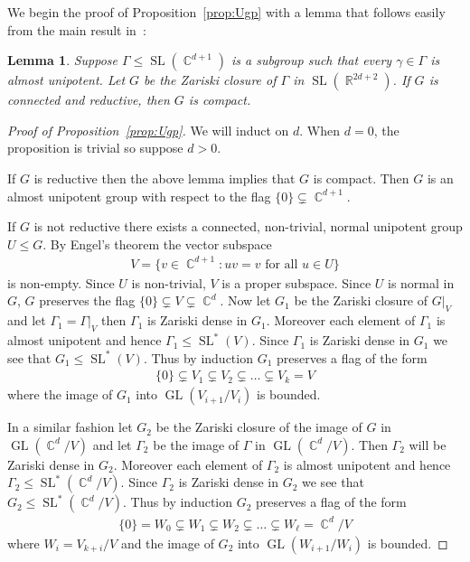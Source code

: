 \documentclass[12pt]{amsart}
\theoremstyle{plain}
\newtheorem{lemma}[proposition]{Lemma}
\theoremstyle{definition}
\theoremstyle{remark}
\begin{document}
We begin the proof of Proposition~\ref{prop:Ugp} with a lemma that follows easily from the main result in~\cite{P1993}:

\begin{lemma}\cite{P1993}
Suppose $\Gamma \leq \operatorname{SL}(\operatorname{\mathbb{C}}^{d+1})$ is a subgroup such that every $\gamma \in \Gamma$ is almost unipotent. Let $G$ be the Zariski closure of $\Gamma$ in $\operatorname{SL}(\operatorname{\mathbb{R}}^{2d+2})$. If $G$ is connected and reductive, then $G$ is compact.
\end{lemma}

\begin{proof}[Proof of Proposition~\ref{prop:Ugp}]
We will induct on $d$. When $d=0$, the proposition is trivial so suppose $d>0$. 

If $G$ is reductive then the above lemma implies that $G$ is compact. Then $G$ is an almost unipotent group with respect to the flag $\{0\} \subsetneq \operatorname{\mathbb{C}}^{d+1}$. 

If $G$ is not reductive there exists a connected, non-trivial, normal unipotent group $U \leq G$. By Engel's theorem the vector subspace
\begin{align*}
V = \{ v \in \operatorname{\mathbb{C}}^{d+1} : uv=v \text{ for all $u \in U$}\}
\end{align*}
is non-empty. Since $U$ is non-trivial, $V$ is a proper subspace. Since $U$ is normal in $G$, $G$ preserves the flag $\{0\} \subsetneq V \subsetneq \operatorname{\mathbb{C}}^d$. Now let $G_1$ be the Zariski closure of $G |_{V}$ and let $\Gamma_1 = \Gamma |_{V}$ then $\Gamma_1$ is Zariski dense in $G_1$. Moreover each element of $\Gamma_1$ is almost unipotent and hence $\Gamma_1 \leq \operatorname{SL}^*(V)$. Since $\Gamma_1$ is Zariski dense in $G_1$ we see that $G_1 \leq \operatorname{SL}^*(V)$. Thus by induction $G_1$ preserves a flag of the form
\begin{align*}
\{0\} \subsetneq V_1 \subsetneq V_2 \subsetneq \dots \subsetneq V_k=V 
\end{align*}
where the image of $G_1$ into $\operatorname{GL}(V_{i+1}/V_i)$ is bounded. 

In a similar fashion let $G_2$ be the Zariski closure of the image of $G$ in $\operatorname{GL}(\operatorname{\mathbb{C}}^d/V)$ and let $\Gamma_2$ be the image of $\Gamma$ in $\operatorname{GL}(\operatorname{\mathbb{C}}^d/V)$. Then $\Gamma_2$ will be Zariski dense in $G_2$. Moreover each element of $\Gamma_2$ is almost unipotent and hence $\Gamma_2 \leq \operatorname{SL}^*(\operatorname{\mathbb{C}}^d/V)$. Since $\Gamma_2$ is Zariski dense in $G_2$ we see that $G_2 \leq \operatorname{SL}^*(\operatorname{\mathbb{C}}^d/V)$. Thus by induction $G_2$ preserves a flag of the form
\begin{align*}
\{0\}=W_0 \subsetneq W_1 \subsetneq W_2 \subsetneq \dots \subsetneq W_\ell=\operatorname{\mathbb{C}}^d/V
\end{align*}
where $W_i = V_{k+i}/V$ and the image of  $G_2$ into $\operatorname{GL}(W_{i+1}/W_i)$ is bounded. 


\end{proof}
\end{document}
